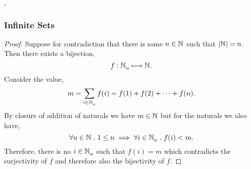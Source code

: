 \documentclass[../MathsNotesBase.tex]{subfiles}
\begin{document}
{\begin{exe}
		\end{exe}
		\sep
	
	

	
		
		\biggerskip
		\subsubsection{Infinite Sets}
		
		
		\bigskip
		\begin{proof}
			Suppose for contradiction that there is some ${ n \in \mathbb{N}^{} }$ such that ${ \left\lvert\mathbb{N}^{}\right\rvert = n }$. Then there exists a bijection,
			\[ f: \mathbb{N}^{}_n \longmapsto \mathbb{N}^{}. \]
			Consider the value,
			\[ m = \sum_{i \in \mathbb{N}^{}_n} f(i) = f(1) + f(2) + \cdots + f(n). \]
			By closure of addition of naturals we have ${ m \in \mathbb{N}^{} }$ but for the naturals we also have,
			\[ \forall n \in \mathbb{N}^{} \;.\; 1 \leq n \implies \forall i \in \mathbb{N}^{}_n \;.\; f(i) < m. \]
			Therefore, there is no ${ i \in \mathbb{N}^{}_n }$ such that ${ f(i) = m }$ which contradicts the surjectivity of $f$ and therefore also the bijectivity of $f$.
		\end{proof}
		
	}
\end{document}
